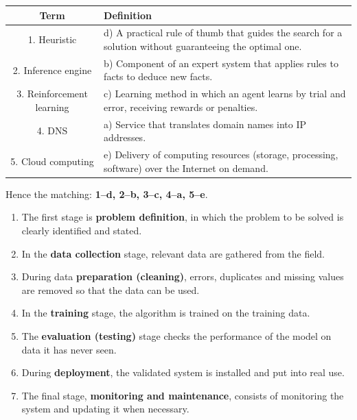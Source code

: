 \documentclass[11pt]{article}
\begin{document}
\begin{corrige}
\begin{center}
\begin{tabular}{|c|l|}\hline
\rowcolor{popblueL} \textbf{Term} & \textbf{Definition} \\ \hline
1. Heuristic & d) A practical rule of thumb that guides the search for a solution without guaranteeing the optimal one. \\ \hline
2. Inference engine & b) Component of an expert system that applies rules to facts to deduce new facts. \\ \hline
3. Reinforcement learning & c) Learning method in which an agent learns by trial and error, receiving rewards or penalties. \\ \hline
4. DNS & a) Service that translates domain names into IP addresses. \\ \hline
5. Cloud computing & e) Delivery of computing resources (storage, processing, software) over the Internet on demand. \\ \hline
\end{tabular}
\end{center}
Hence the matching: \textbf{1--d, 2--b, 3--c, 4--a, 5--e}.
\end{corrige}

\begin{corrige}
\begin{enumerate}
\item The first stage is \textbf{problem definition}, in which the problem to be solved is clearly identified and stated.
\item In the \textbf{data collection} stage, relevant data are gathered from the field.
\item During data \textbf{preparation (cleaning)}, errors, duplicates and missing values are removed so that the data can be used.
\item In the \textbf{training} stage, the algorithm is trained on the training data.
\item The \textbf{evaluation (testing)} stage checks the performance of the model on data it has never seen.
\item During \textbf{deployment}, the validated system is installed and put into real use.
\item The final stage, \textbf{monitoring and maintenance}, consists of monitoring the system and updating it when necessary.
\end{enumerate}
\end{corrige}
\end{document}
